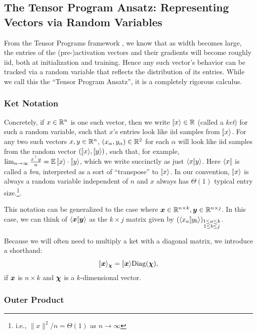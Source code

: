 \documentclass{article}
\theoremstyle{plain}
\theoremstyle{definition}
\begin{document}
\subsection{The Tensor Program Ansatz: Representing Vectors via Random Variables}
\label{sec:TPansatz}

From the Tensor Programs framework \citep{yang2022tensor}, we know that as width becomes large, the entries of the (pre-)activation
vectors and their gradients will become roughly iid, both at initialization and training. Hence any such vector's behavior can be
tracked via a random variable that reflects the distribution of its
entries. While we call this the ``Tensor Program Ansatz'', it is a completely rigorous calculus.

\subsubsection{Ket Notation}

Concretely, if $x\in\mathbb{R}^{n}$ is one such vector, then we write $\ket x \in \R$ (called a \emph{ket})
for such a random variable, such that $x$'s entries look like iid
samples from $\ket{x}$.%
For any two such vectors $x, y \in \mathbb{R}^n$, $(x_\alpha, y_\alpha) \in \mathbb{R}^2$ for each $\alpha$ will look like iid samples from the random vector $(\ket x, \ket y)$, such that, for example, $\lim_{n\to\infty}\frac{x^{\top}y}{n}=\EV \ket{x}\cdot \ket{y}$, which we write succinctly as just $\braket x y$.
Here $\bra x$ is called a \emph{bra}, interpreted as a sort of ``transpose'' to $\ket x$.
In our convention, $\ket x$ is always a random variable independent of $n$ and $x$ always has $\Theta(1)$ typical entry size.\footnote{i.e., $\|x\|^{2}/n=\Theta(1)$ as $n\to\infty$}.

This notation can be generalized to the case where $\boldsymbol{x} \in \mathbb{R}^{n \times k}, \boldsymbol{y} \in \mathbb{R}^{n \times j}$. In this case, we can think of $\braket{\xx}{\yy}$ as the $k \times j$ matrix given by $(\braket{x_a}{y_b})_{\substack{1 \leq a \leq k \\ 1 \leq b \leq j}}$.

Because we will often need to multiply a ket with a diagonal matrix, we introduce a shorthand:
\begin{equation}
  \ket\xx _{\cchi} = \ket\xx \Diag(\cchi),\label{eqn:multdiagnotation}
\end{equation}
if $\boldsymbol{x}$ is $n\times k$ and $\boldsymbol{\chi}$ is a $k$-dimensional vector.

\subsubsection{Outer Product}
\label{sec:ket_outer}
\end{document}
